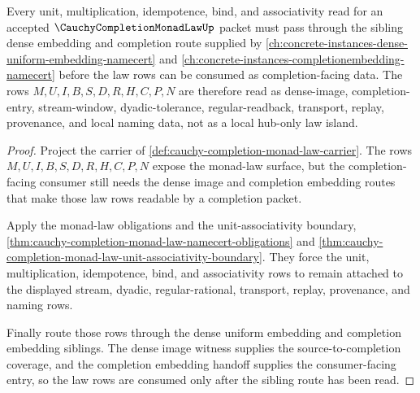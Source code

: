 \begin{theorem}
\label{thm:cauchy-completion-monad-law-dense-embedding-dependency}
Every unit, multiplication, idempotence, bind, and associativity read for an accepted $\CauchyCompletionMonadLawUp$ packet must pass through the sibling dense embedding and completion route supplied by \autoref{ch:concrete-instances-dense-uniform-embedding-namecert} and \autoref{ch:concrete-instances-completionembedding-namecert} before the law rows can be consumed as completion-facing data. The rows $M,U,I,B,S,D,R,H,C,P,N$ are therefore read as dense-image, completion-entry, stream-window, dyadic-tolerance, regular-readback, transport, replay, provenance, and local naming data, not as a local hub-only law island.
\end{theorem}
\begin{proof}
Project the carrier of \autoref{def:cauchy-completion-monad-law-carrier}. The rows $M,U,I,B,S,D,R,H,C,P,N$ expose the monad-law surface, but the completion-facing consumer still needs the dense image and completion embedding routes that make those law rows readable by a completion packet.

Apply the monad-law obligations and the unit-associativity boundary, \autoref{thm:cauchy-completion-monad-law-namecert-obligations} and \autoref{thm:cauchy-completion-monad-law-unit-associativity-boundary}. They force the unit, multiplication, idempotence, bind, and associativity rows to remain attached to the displayed stream, dyadic, regular-rational, transport, replay, provenance, and naming rows.

Finally route those rows through the dense uniform embedding and completion embedding siblings. The dense image witness supplies the source-to-completion coverage, and the completion embedding handoff supplies the consumer-facing entry, so the law rows are consumed only after the sibling route has been read.
\end{proof}

